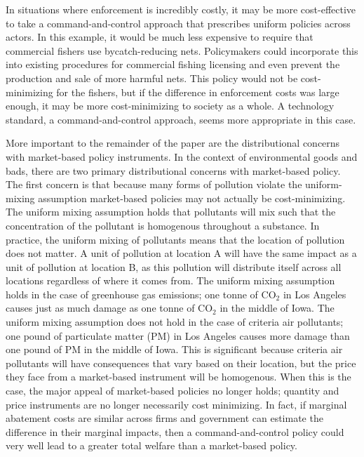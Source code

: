 In situations where enforcement is incredibly costly, it may be more cost-effective to take a command-and-control approach that prescribes uniform policies across actors. In this example, it would be much less expensive to require that commercial fishers use bycatch-reducing nets. Policymakers could incorporate this into existing procedures for commercial fishing licensing and even prevent the production and sale of more harmful nets. This policy would not be cost-minimizing for the fishers, but if the difference in enforcement costs was large enough, it may be more cost-minimizing to society as a whole. A technology standard, a command-and-control approach, seems more appropriate in this case.

More important to the remainder of the paper are the distributional concerns with market-based policy instruments. In the context of environmental goods and bads, there are two primary distributional concerns with market-based policy. The first concern is that because many forms of pollution violate the uniform-mixing assumption market-based policies may not actually be cost-minimizing. The uniform mixing assumption holds that pollutants will mix such that the concentration of the pollutant is homogenous throughout a substance. In practice, the uniform mixing of pollutants means that the location of pollution does not matter. A unit of pollution at location A will have the same impact as a unit of pollution at location B, as this pollution will distribute itself across all locations regardless of where it comes from. The uniform mixing assumption holds in the case of greenhouse gas emissions; one tonne of CO$_2$ in Los Angeles causes just as much damage as one tonne of CO$_2$ in the middle of Iowa. The uniform mixing assumption does not hold in the case of criteria air pollutants; one pound of particulate matter (PM) in Los Angeles causes more damage than one pound of PM in the middle of Iowa. This is significant because criteria air pollutants will have consequences that vary based on their location, but the price they face from a market-based instrument will be homogenous. When this is the case, the major appeal of market-based policies no longer holds; quantity and price instruments are no longer necessarily cost minimizing. In fact, if marginal abatement costs are similar across firms and government can estimate the difference in their marginal impacts, then a command-and-control policy could very well lead to a greater total welfare than a market-based policy.

